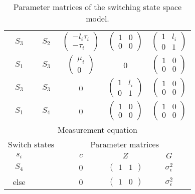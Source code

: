 \documentclass[12pt]{article}
\begin{document}
\begin{table}[h!]
\begin{tabular}[h!]{cc|ccc}
  $S_3$ & $S_2$ & $\begin{pmatrix} -l_i\tau_i\\ -\tau_i\end{pmatrix}$ 
                                    & $\begin{pmatrix} 1 & 0 \\ 0 &
                                      0 \end{pmatrix}$ 
          & $\begin{pmatrix} 1 & l_i\\ 0 & 1 \end{pmatrix}$\\
  $S_1$ & $S_3$ & $\begin{pmatrix} \mu_i\\0\end{pmatrix}$ & 0
          & $\begin{pmatrix} 1 & 0\\ 0 & 0 \end{pmatrix}$\\
  $S_3$ & $S_3$ & 0& $\begin{pmatrix} 1 & l_i \\ 0 & 1 \end{pmatrix}$ 
        & $\begin{pmatrix}1&0\\0&0\end{pmatrix}$\\
  $S_1$ &  $S_4$ & 0 & $\begin{pmatrix}1&0\\0&0\end{pmatrix}$ 
        & $\begin{pmatrix}1&0\\0&0\end{pmatrix}$\\
  \hline\hline
  \multicolumn{5}{c}{Measurement equation}\\
  \hline
  \multicolumn{2}{c|}{Switch states} & \multicolumn{3}{c}{Parameter
                                      matrices}\\
  $s_i$ && $c$ & $Z$ & $G$\\
  \hline
  $S_4$ & & 0 & $\begin{pmatrix} 1 & 1 \end{pmatrix}$ &
                                                                  $\sigma^2_\epsilon$\\
  else && 0 & $\begin{pmatrix} 1 & 0 \end{pmatrix}$ &
                                                                  $\sigma^2_\epsilon$\\
  \hline\hline
\end{tabular}
\caption{Parameter matrices of the switching state space model.\label{tab:parmats}}
\end{table}
\end{document}
